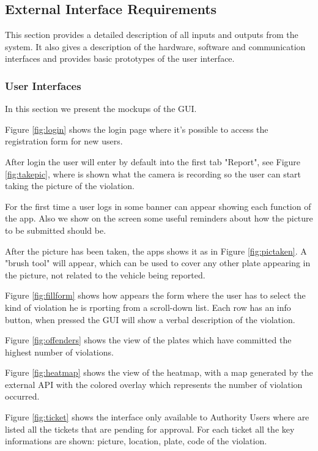 \subsection{External Interface Requirements}
This section provides a detailed description of all inputs and outputs from the system. It also gives a description of the hardware, software and communication interfaces and provides basic prototypes of the user interface.

\subsubsection{User Interfaces}
In this section we present the mockups of the GUI.

Figure \ref{fig:login} shows the login page where it's possible to access the registration form for new users.

After login the user will enter by default into the first tab "Report", see Figure \ref{fig:takepic}, where is shown what the camera is recording so the user can start taking the picture of the violation.

For the first time a user logs in some banner can appear showing each function of the app. Also we show on the screen some useful reminders about how the picture to be submitted should be.

After the picture has been taken, the apps shows it as in Figure \ref{fig:pictaken}. A  "brush tool" will appear, which can be used to cover any other plate appearing in the picture, not related to the vehicle being reported.

Figure \ref{fig:fillform} shows how appears the form where the user has to select the kind of violation he is rporting from a scroll-down list. Each row has an info button, when pressed the GUI will show a verbal description of the violation.

Figure \ref{fig:offenders} shows the view of the plates which have committed the highest number of violations.

Figure \ref{fig:heatmap} shows the view of the heatmap, with a map generated by the external API with the colored overlay which represents the number of violation occurred.

Figure \ref{fig:ticket} shows the interface only available to Authority Users where are listed all the tickets that are pending for approval. For each ticket all the key informations are shown: picture, location, plate, code of the violation.

